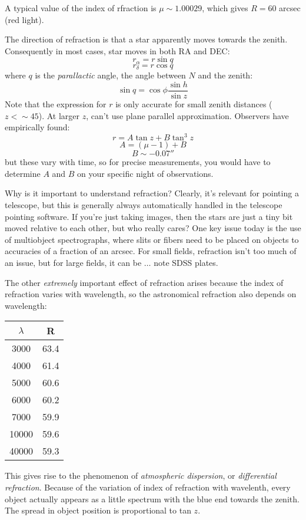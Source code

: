 \documentclass[12pt]{article}
\begin{document}
A typical value of the index of rfraction is $\mu \sim 1.00029$, which
gives $R = 60$ arcsec (red light).

The direction of refraction is that a star apparently moves towards
the zenith. Consequently in most cases, star moves in both RA and DEC:
    $$ r_{\alpha} = r\sin q $$
    $$ r_{\delta} = r\cos q $$
where $q$ is the \emph{parallactic} angle, the angle between $N$ and
the zenith:
    $$ \sin q = \cos\phi\frac{\sin h}{\sin z} $$
Note that the expression for $r$ is only accurate for small zenith
distances ($z < \sim 45$). At larger $z$, can't use plane parallel
approximation. Observers have empirically found: 
    $$ r = A\tan z + B\tan^3z $$
    $$ A = (\mu - 1) + B $$
    $$ B \sim -0.07'' $$
but these vary with time, so for precise measurements, you would have
to determine $A$ and $B$ on your specific night of observations.

Why is it important to understand refraction? Clearly, it's relevant
for pointing a telescope, but this is generally always automatically
handled in the telescope pointing software. If you're just taking
images, then the stars are just a tiny bit moved relative to each
other, but who really cares? One key issue today is the use of
multiobject spectrographs, where slits or fibers need to be placed on
objects to accuracies of a fraction of an arcsec. For small fields,
refraction isn't too much of an issue, but for large fields, it can be
$\ldots$ note SDSS plates.

The other \emph{extremely} important effect of refraction arises because the
index of refraction varies with wavelength, so the astronomical
refraction also depends on wavelength: 
\begin{table}[h]
    \centering
    \begin{tabular}{c c}
    \hline\hline
    $\lambda$ & R\\
    \hline
    3000 & 63.4\\
    4000 & 61.4\\
    5000 & 60.6\\
    6000 & 60.2\\
    7000 & 59.9\\
    10000 & 59.6\\
    40000 & 59.3\\
    \hline
    \end{tabular}
\end{table}
This gives rise to the phenomenon of \emph{atmospheric dispersion}, or
\emph{differential refraction}. Because of the variation of index of
refraction with wavelenth, every object actually appears as a little
spectrum with the blue end towards the zenith. The spread in object
position is proportional to tan $z$.
\end{document}
